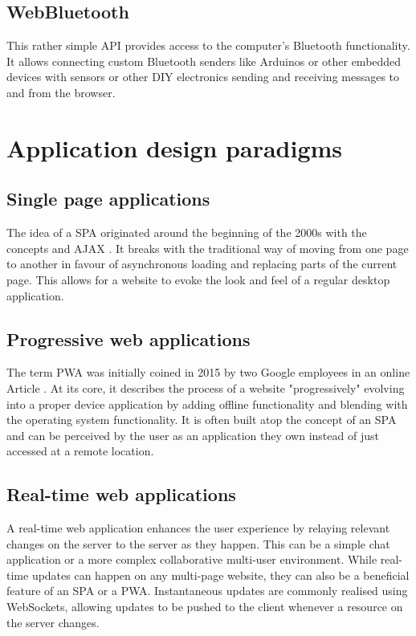 \subsection{WebBluetooth}

This rather simple \ac{API} provides access to the computer's Bluetooth functionality. It allows connecting custom Bluetooth senders like Arduinos or other embedded devices with sensors or other \ac{DIY} electronics sending and receiving messages to and from the browser.


\section{Application design paradigms}

\subsection{Single page applications}

The idea of a \ac{SPA} originated around the beginning of the 2000s with the concepts  \parencite{innerBrowsing} and \ac{AJAX} \parencite{ajaxNewApproach}. It breaks with the traditional way of moving from one page to another in favour of asynchronous loading and replacing parts of the current page. This allows for a website to evoke the look and feel of a regular desktop application.

\subsection{Progressive web applications}

The term \ac{PWA} was initially coined in 2015 by two Google employees in an online Article \parencite{progressiveWebApplications}. At its core, it describes the process of a website "progressively" evolving into a proper device application by adding offline functionality and blending with the operating system functionality. It is often built atop the concept of an \ac{SPA} and can be perceived by the user as an application they own instead of just accessed at a remote location.

\subsection{Real-time web applications}

A real-time web application enhances the user experience by relaying relevant changes on the server to the server as they happen. This can be a simple chat application or a more complex collaborative multi-user environment. While real-time updates can happen on any multi-page website, they can also be a beneficial feature of an \ac{SPA} or a \ac{PWA}. Instantaneous updates are commonly realised using WebSockets, allowing updates to be pushed to the client whenever a resource on the server changes.



